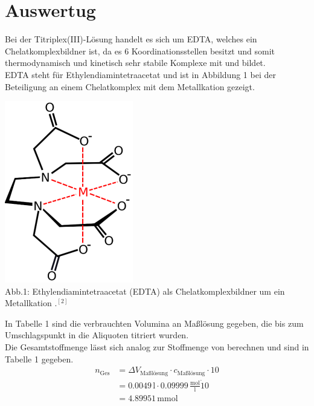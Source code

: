 \documentclass[12pt]{scrartcl} %
\begin{document}
\section{Auswertug}
Bei der Titriplex(III)-Lösung handelt es sich um EDTA, welches ein Chelatkomplexbildner ist, da es 6 Koordinationsstellen besitzt und somit thermodynamisch und kinetisch sehr stabile Komplexe mit  und  bildet.\\
EDTA steht für Ethylendiamintetraacetat und ist in Abbildung 1 bei der Beteiligung an einem Chelatkomplex mit dem Metallkation  gezeigt.\\
\begin{center}
  \includegraphics{Abb/EDTA.png}\\
  Abb.1: Ethylendiamintetraacetat (EDTA) als Chelatkomplexbildner um ein Metallkation .$^{[2]}$
\end{center}

In Tabelle 1 sind die verbrauchten Volumina an Maßlösung gegeben, die bis zum Umschlagspunkt in die Aliquoten titriert wurden.\\
Die Gesamtstoffmenge lässt sich analog zur Stoffmenge von  berechnen und sind in Tabelle 1 gegeben.
\begin{align*}
  n_{\mathrm{Ges}} &= \Delta V_{\text{Maßlösung}} \cdot c_{\text{Maßlösung}} \cdot 10\\
  &= 0.0049\,\mathrm{l} \cdot 0.09999\,\mathrm{\frac{mol}{l}} \dot 10\\
  &= 4.89951\,\mathrm{mmol}
\end{align*}

\newpage
\end{document}
